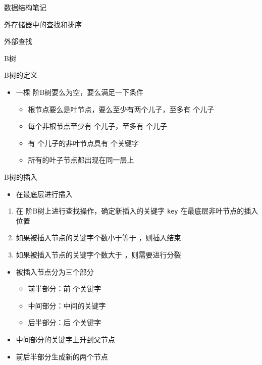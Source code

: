 \documentclass[
  ignorenonframetext,
]{beamer}
\providecommand{\tightlist}{%
  \setlength{\itemsep}{0pt}\setlength{\parskip}{0pt}}
\begin{document}
\begin{frame}[fragile]{数据结构笔记}
\begin{block}{外存储器中的查找和排序}
\begin{block}{外部查找}
\begin{block}{B树}
\begin{block}{B树的定义}
\protect{}\label{bux6811ux7684ux5b9aux4e49}
\begin{itemize}
\tightlist
\item
  一棵 {} 阶B树要么为空，要么满足一下条件

  \begin{itemize}
  \tightlist
  \item
    根节点要么是叶节点，要么至少有两个儿子，至多有 {} 个儿子
  \item
    每个非根节点至少有 {} 个儿子，至多有 {} 个儿子
  \item
    有 {} 个儿子的非叶节点具有 {} 个关键字
  \item
    所有的叶子节点都出现在同一层上
  \end{itemize}
\end{itemize}
\end{block}

\begin{block}{B树的插入}
\protect{}\label{bux6811ux7684ux63d2ux5165}
\begin{itemize}
\tightlist
\item
  在最底层进行插入
\end{itemize}

\begin{enumerate}
\tightlist
\item
  在 {} 阶B树上进行查找操作，确定新插入的关键字 \texttt{key}
  在最底层非叶节点的插入位置
\item
  如果被插入节点的关键字个数小于等于 {}，则插入结束
\item
  如果被插入节点的关键字个数大于 {}，则需要进行分裂
\end{enumerate}

\begin{itemize}
\tightlist
\item
  被插入节点分为三个部分

  \begin{itemize}
  \tightlist
  \item
    前半部分：前 {} 个关键字
  \item
    中间部分：中间的关键字
  \item
    后半部分：后 {} 个关键字
  \end{itemize}
\item
  中间部分的关键字上升到父节点
\item
  前后半部分生成新的两个节点
\end{itemize}
\end{block}


\end{block}
\end{block}
\end{block}
\end{frame}
\end{document}
